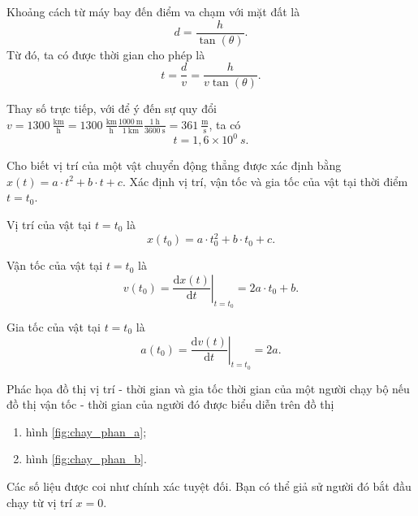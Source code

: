 \documentclass[a4paper, titlepage, openany]{book}
\newcounter{exercise}
\newcounter{solution}
\begin{document}
\solution

Khoảng cách từ máy bay đến điểm va chạm với mặt đất là $$d=\frac{h}{\tan{(\theta)}}.$$ Từ đó, ta có được thời gian cho phép là $$t=\frac{d}{v}=\frac{h}{v\tan{(\theta)}}.$$

Thay số trực tiếp, với để ý đến sự quy đổi $v=1300\ \frac{\text{km}}{\text{h}}=1300\ \frac{\text{km}}{\text{h}}\frac{1000\ \text{m}}{1\ \text{km}}\frac{1\ \text{h}}{3600\ \text{s}}=361\ \frac{\text{m}}{\text{s}}$, ta có $$t=\boxed{1{,}6\times 10^0\ s}.$$

\exercise Cho biết vị trí của một vật chuyển động thẳng được xác định bằng $x(t) = a\cdot t^2+b\cdot t+c$. Xác định vị trí, vận tốc và gia tốc của vật tại thời điểm $t=t_0$.

\solution

Vị trí của vật tại $t=t_0$ là $$x\left(t_0\right)=\boxed{a\cdot t_0^2+b\cdot t_0+c}.$$

Vận tốc của vật tại $t=t_0$ là $$v\left(t_0\right)=\left.\frac{\mathrm{d}x(t)}{\mathrm{d}t}\right|_{t=t_0}=\boxed{2a\cdot t_0+b}.$$

Gia tốc của vật tại $t=t_0$ là $$a\left(t_0\right)=\left.\frac{\mathrm{d}v(t)}{\mathrm{d}t}\right|_{t=t_0}=\boxed{2a}.$$

\exercise Phác họa đồ thị vị trí - thời gian và gia tốc thời gian của một người chạy bộ nếu đồ thị vận tốc - thời gian của người đó được biểu diễn trên đồ thị
\begin{enumerate}
   \item hình \ref{fig:chay_phan_a};
   \item hình \ref{fig:chay_phan_b}.
\end{enumerate}
Các số liệu được coi như chính xác tuyệt đối. Bạn có thể giả sử người đó bắt đầu chạy từ vị trí $x = 0$.
\end{document}
